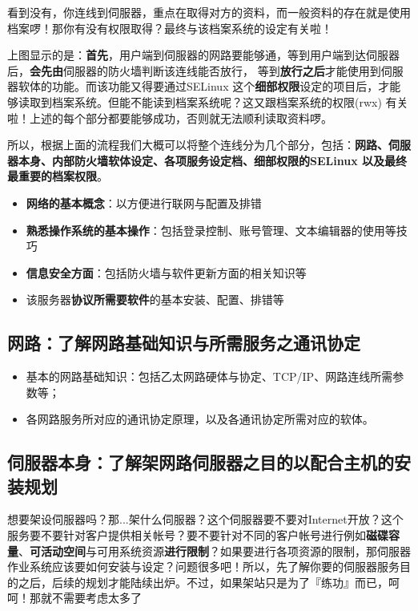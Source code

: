 \documentclass[UTF8,a4paper,12pt]{ctexbook}
\begin{document}
		看到没有，你连线到伺服器，重点在取得对方的资料，而一般资料的存在就是使用档案啰！那你有没有权限取得？最终与该档案系统的设定有关啦！
		
		上图显示的是：\textbf{首先}，用户端到伺服器的网路要能够通，等到用户端到达伺服器后，\textbf{会先由}伺服器的防火墙判断该连线能否放行， 等到\textbf{放行之后}才能使用到伺服器软体的功能。而该功能又得要通过SELinux 这个\textbf{细部权限}设定的项目后，才能够读取到档案系统。但能不能读到档案系统呢？这又跟档案系统的权限(rwx) 有关啦！上述的每个部分都要能够成功，否则就无法顺利读取资料啰。
		
		所以，根据上面的流程我们大概可以将整个连线分为几个部分，包括：\textbf{网路、伺服器本身、内部防火墙软体设定、各项服务设定档、细部权限的SELinux 以及最终最重要的档案权限}。
		\begin{itemize}
			\item \textbf{网络的基本概念}：以方便进行联网与配置及排错
			\item \textbf{熟悉操作系统的基本操作}：包括登录控制、账号管理、文本编辑器的使用等技巧
			\item \textbf{信息安全方面}：包括防火墙与软件更新方面的相关知识等
			\item 该服务器\textbf{协议所需要软件}的基本安装、配置、排错等
		\end{itemize}
		
		\subsection{网路：了解网路基础知识与所需服务之通讯协定}
			\begin{itemize}
				\item 基本的网路基础知识：包括乙太网路硬体与协定、TCP/IP、网路连线所需参数等；
				\item 各网路服务所对应的通讯协定原理，以及各通讯协定所需对应的软体。
			\end{itemize}
		
		\subsection{伺服器本身：了解架网路伺服器之目的以配合主机的安装规划}
			想要架设伺服器吗？那...架什么伺服器？这个伺服器要不要对Internet开放？这个服务要不要针对客户提供相关帐号？要不要针对不同的客户帐号进行例如\textbf{磁碟容量}、\textbf{可活动空间}与可用系统资源\textbf{进行限制}？如果要进行各项资源的限制，那伺服器作业系统应该要如何安装与设定？问题很多吧！所以，先了解你要的伺服器服务目的之后，后续的规划才能陆续出炉。不过，如果架站只是为了『练功』而已，呵呵！那就不需要考虑太多了
			
\end{document}
